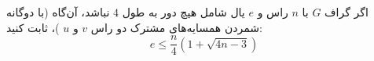 \EXERCISE
اگر گراف
$G$
با
$n$
راس و
$e$
یال شامل هیچ دور به طول
$4$
نباشد، آن‌گاه (با دوگانه شمردن همسایه‌های مشترک دو راس
$v$
و
$u$
)، ثابت کنید:
$$e \leq \frac{n}{4}(1 + \sqrt{4n - 3})$$